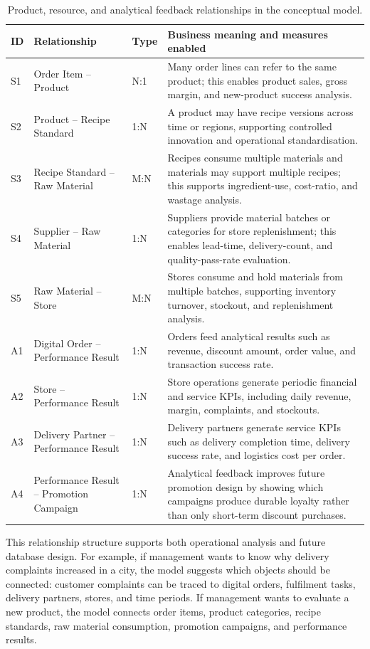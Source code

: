 \documentclass[12pt,a4paper]{article}
\renewcommand{\arraystretch}{1.28}
\begin{document}
\begin{table}[H]
\centering
\small
\renewcommand{\arraystretch}{1.18}
\caption{Product, resource, and analytical feedback relationships in the conceptual model.}
\begin{tabularx}{\textwidth}{P{1.0cm}P{4.0cm}P{1.5cm}Y}
\toprule
\textbf{ID} & \textbf{Relationship} & \textbf{Type} & \textbf{Business meaning and measures enabled} \\
\midrule
S1 & Order Item -- Product & N:1 & Many order lines can refer to the same product; this enables product sales, gross margin, and new-product success analysis. \\
S2 & Product -- Recipe Standard & 1:N & A product may have recipe versions across time or regions, supporting controlled innovation and operational standardisation. \\
S3 & Recipe Standard -- Raw Material & M:N & Recipes consume multiple materials and materials may support multiple recipes; this supports ingredient-use, cost-ratio, and wastage analysis. \\
S4 & Supplier -- Raw Material & 1:N & Suppliers provide material batches or categories for store replenishment; this enables lead-time, delivery-count, and quality-pass-rate evaluation. \\
S5 & Raw Material -- Store & M:N & Stores consume and hold materials from multiple batches, supporting inventory turnover, stockout, and replenishment analysis. \\
A1 & Digital Order -- Performance Result & 1:N & Orders feed analytical results such as revenue, discount amount, order value, and transaction success rate. \\
A2 & Store -- Performance Result & 1:N & Store operations generate periodic financial and service KPIs, including daily revenue, margin, complaints, and stockouts. \\
A3 & Delivery Partner -- Performance Result & 1:N & Delivery partners generate service KPIs such as delivery completion time, delivery success rate, and logistics cost per order. \\
A4 & Performance Result -- Promotion Campaign & 1:N & Analytical feedback improves future promotion design by showing which campaigns produce durable loyalty rather than only short-term discount purchases. \\
\bottomrule
\end{tabularx}
\end{table}

This relationship structure supports both operational analysis and future database design. For example, if management wants to know why delivery complaints increased in a city, the model suggests which objects should be connected: customer complaints can be traced to digital orders, fulfilment tasks, delivery partners, stores, and time periods. If management wants to evaluate a new product, the model connects order items, product categories, recipe standards, raw material consumption, promotion campaigns, and performance results.
\end{document}
